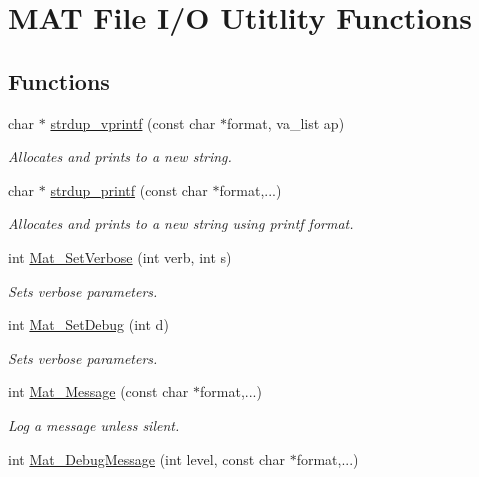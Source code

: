 \hypertarget{group__mat__util}{\section{M\-A\-T File I/\-O Utitlity Functions}
\label{group__mat__util}
}
\subsection*{Functions}
\begin{DoxyCompactItemize}
\item 
char $\ast$ \hyperlink{group__mat__util_ga2b342987d3b664345cb233640b611fe9}{strdup\-\_\-vprintf} (const char $\ast$format, va\-\_\-list ap)
\begin{DoxyCompactList}\small\item\em Allocates and prints to a new string. \end{DoxyCompactList}\item 
char $\ast$ \hyperlink{group__mat__util_ga291b08f933c75fb70e3736b669896ebd}{strdup\-\_\-printf} (const char $\ast$format,...)
\begin{DoxyCompactList}\small\item\em Allocates and prints to a new string using printf format. \end{DoxyCompactList}\item 
int \hyperlink{group__mat__util_gaf348b811ee26bfc923924878cea3c9ba}{Mat\-\_\-\-Set\-Verbose} (int verb, int s)
\begin{DoxyCompactList}\small\item\em Sets verbose parameters. \end{DoxyCompactList}\item 
int \hyperlink{group__mat__util_gad75e2962dcaf2ac366f2420bb5b13094}{Mat\-\_\-\-Set\-Debug} (int d)
\begin{DoxyCompactList}\small\item\em Sets verbose parameters. \end{DoxyCompactList}\item 
int \hyperlink{group__mat__util_gae7dfa394b111bc908a616f8f5bddaa97}{Mat\-\_\-\-Message} (const char $\ast$format,...)
\begin{DoxyCompactList}\small\item\em Log a message unless silent. \end{DoxyCompactList}\item 
int \hyperlink{group__mat__util_ga26e00cfb07551be5201fd9e0f04066d9}{Mat\-\_\-\-Debug\-Message} (int level, const char $\ast$format,...)

\end{DoxyCompactItemize}
